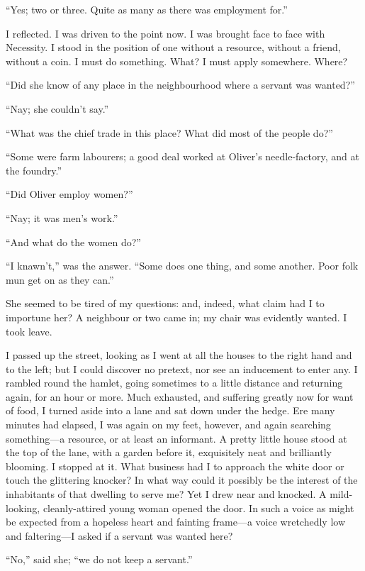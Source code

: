 \enquote{Yes; two or three. Quite as many as there was employment for.}

I reflected. I was driven to the point now. I was brought face to face
with Necessity. I stood in the position of one without a resource,
without a friend, without a coin. I must do something. What? I must
apply somewhere. Where?

\enquote{Did she know of any place in the neighbourhood where a servant
was wanted?}

\enquote{Nay; she couldn't say.}

\enquote{What was the chief trade in this place? What did most of the
people do?}

\enquote{Some were farm labourers; a good deal worked at \Mr{} Oliver's
needle-factory, and at the foundry.}

\enquote{Did \Mr{} Oliver employ women?}

\enquote{Nay; it was men's work.}

\enquote{And what do the women do?}

\enquote{I knawn't,} was the answer. \enquote{Some does one thing, and
some another. Poor folk mun get on as they can.}

She seemed to be tired of my questions: and, indeed, what claim had I to
importune her? A neighbour or two came in; my chair was evidently
wanted. I took leave.

I passed up the street, looking as I went at all the houses to the right
hand and to the left; but I could discover no pretext, nor see an
inducement to enter any. I rambled round the hamlet, going sometimes to
a little distance and returning again, for an hour or more. Much
exhausted, and suffering greatly now for want of food, I turned aside
into a lane and sat down under the hedge. Ere many minutes had elapsed,
I was again on my feet, however, and again searching something---a
resource, or at least an informant. A pretty little house stood at the
top of the lane, with a garden before it, exquisitely neat and
brilliantly blooming. I stopped at it. What business had I to approach
the white door or touch the glittering knocker? In what way could it
possibly be the interest of the inhabitants of that dwelling to serve
me? Yet I drew near and knocked. A mild-looking, cleanly-attired young
woman opened the door. In such a voice as might be expected from a
hopeless heart and fainting frame---a voice wretchedly low and
faltering---I asked if a servant was wanted here?

\enquote{No,} said she; \enquote{we do not keep a servant.}

